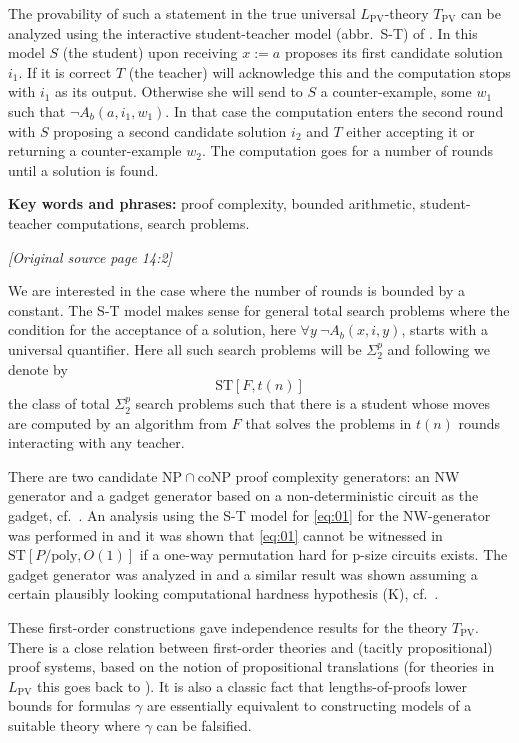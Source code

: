 \documentclass[11pt]{article}
\newcommand{\LPV}{L_{\mathrm{PV}}}
\newcommand{\TPV}{T_{\mathrm{PV}}}
\newcommand{\NP}{\mathrm{NP}}
\newcommand{\coNP}{\mathrm{coNP}}
\newcommand{\ST}{\mathrm{ST}}
\newcommand{\sourcepage}[1]{\par\Needspace{5\baselineskip}\bigskip\noindent\textit{[Original source page 14:#1]}\par\medskip}
\begin{document}
The provability of such a statement in the true universal $\LPV$-theory $\TPV$ can be analyzed using the interactive student-teacher model (abbr.\ S-T) of \cite{KPS90}. In this model $S$ (the student) upon receiving $x:=a$ proposes its first candidate solution $i_1$. If it is correct $T$ (the teacher) will acknowledge this and the computation stops with $i_1$ as its output. Otherwise she will send to $S$ a counter-example, some $w_1$ such that $\neg A_b(a,i_1,w_1)$. In that case the computation enters the second round with $S$ proposing a second candidate solution $i_2$ and $T$ either accepting it or returning a counter-example $w_2$. The computation goes for a number of rounds until a solution is found.

\noindent\textbf{Key words and phrases:} proof complexity, bounded arithmetic, student-teacher computations, search problems.

\sourcepage{2}
We are interested in the case where the number of rounds is bounded by a constant. The S-T model makes sense for general total search problems where the condition for the acceptance of a solution, here $\forall y\ \neg A_b(x,i,y)$, starts with a universal quantifier. Here all such search problems will be $\Sigma^p_2$ and following \cite{Kra25} we denote by
\[
\ST[F,t(n)]
\]
the class of total $\Sigma^p_2$ search problems such that there is a student whose moves are computed by an algorithm from $F$ that solves the problems in $t(n)$ rounds interacting with any teacher.

There are two candidate $\NP\cap\coNP$ proof complexity generators: an NW generator and a gadget generator based on a non-deterministic circuit as the gadget, cf.\ \cite{Kra25}. An analysis using the S-T model for \eqref{eq:01} for the NW-generator was performed in \cite{Kra11} and it was shown that \eqref{eq:01} cannot be witnessed in $\ST[P/\mathrm{poly},O(1)]$ if a one-way permutation hard for p-size circuits exists. The gadget generator was analyzed in \cite{Kra25} and a similar result was shown assuming a certain plausibly looking computational hardness hypothesis (K), cf.\ \cite[Sec.8.6]{Kra25}.

These first-order constructions gave independence results for the theory $\TPV$. There is a close relation between first-order theories and (tacitly propositional) proof systems, based on the notion of propositional translations (for theories in $\LPV$ this goes back to \cite{Coo75,KP89}). It is also a classic fact that lengths-of-proofs lower bounds for formulas $\gamma$ are essentially equivalent to constructing models of a suitable theory where $\gamma$ can be falsified.
\end{document}
